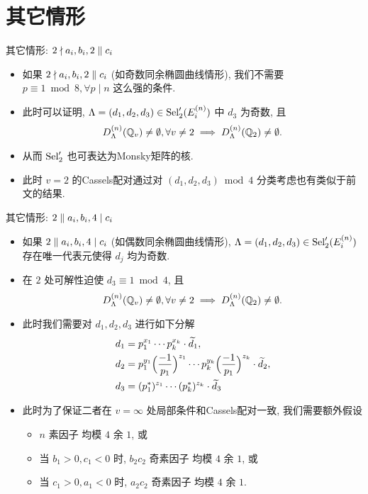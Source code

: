 \documentclass[aspectratio=169,handout]{ctexbeamer}
\begin{document}
\section{其它情形}
\begin{frame}{其它情形: $2\nmid a_i,b_i,2\parallel c_i$}
\begin{itemize}
\item 如果 $2\nmid a_i,b_i,2\parallel c_i$ (如奇数同余椭圆曲线情形), 我们不需要 $p\equiv 1\bmod 8,\forall p\mid n$ 这么强的条件.
\item 此时可以证明, $\Lambda=(d_1,d_2,d_3)\in{\mathrm{Sel}}_2'(E_i^{(n)})$ 中 $d_3$ 为奇数, 且
\[D_{\Lambda}^{(n)}({\mathbb{Q}}_v)\neq\emptyset,\forall v\neq 2
\implies D_{\Lambda}^{(n)}({\mathbb{Q}}_2)\neq\emptyset.\]
\item 从而 ${\mathrm{Sel}}_2'$ 也可表达为Monsky矩阵的核.
\item 此时 $v=2$ 的Cassels配对通过对 $(d_1,d_2,d_3)\bmod 4$ 分类考虑也有类似于前文的结果.
\end{itemize}
\end{frame}


\begin{frame}{其它情形: $2\parallel a_i,b_i, 4\mid c_i$}
\begin{itemize}
\item 如果 $2\parallel a_i,b_i, 4\mid c_i$ (如偶数同余椭圆曲线情形), $\Lambda=(d_1,d_2,d_3)\in{\mathrm{Sel}}_2'(E_i^{(n)})$ 存在唯一代表元使得 $d_j$ 均为奇数.
\item 在 $2$ 处可解性迫使 $d_3\equiv 1\bmod 4$, 且
\[D_{\Lambda}^{(n)}({\mathbb{Q}}_v)\neq\emptyset,\forall v\neq 2
\implies D_{\Lambda}^{(n)}({\mathbb{Q}}_2)\neq\emptyset.\]
\item 此时我们需要对 $d_1,d_2,d_3$ 进行如下分解
\[\begin{split}
	d_1&=p_1^{x_1}\cdots p_k^{x_k}\cdot \widetilde d_1,\\
	d_2&=p_1^{y_1}\Bigl(\frac{{-1}}{p_1}\Bigr)^{z_1}\cdots p_k^{y_k}\Bigl(\frac{{-1}}{p_1}\Bigr)^{z_k}\cdot \widetilde d_2,\\
	d_3&=(p_1^*)^{z_1}\cdots (p_k^*)^{z_k}\cdot \widetilde d_3
\end{split}\]
\item 此时为了保证二者在 $v=\infty$ 处局部条件和Cassels配对一致,
我们需要额外假设
\begin{itemize}
	\item $n$ 素因子 均模 $4$ 余 $1$, 或
	\item 当 $b_1>0, c_1<0$ 时, $b_2c_2$ 奇素因子 均模 $4$ 余 $1$, 或
	\item 当 $c_1>0, a_1<0$ 时, $a_2c_2$ 奇素因子 均模 $4$ 余 $1$.
\end{itemize}
\end{itemize}
\end{frame}
\end{document}
